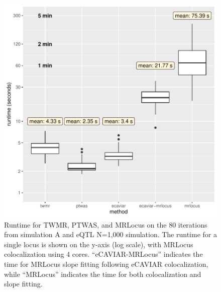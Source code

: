 \documentclass[11pt]{article}
\begin{document}
\begin{figure}[!ht]
  \centering
  \includegraphics[width=.7\textwidth]{figs/runtime}
  \caption{Runtime for TWMR, PTWAS, and MRLocus on the 80 iterations
    from simulation A and eQTL N=1,000 simulation.
    The runtime for a single locus is shown on the y-axis (log
    scale), with MRLocus colocalization using 4
    cores. ``eCAVIAR-MRLocus'' indicates the time for MRLocus slope
    fitting following eCAVIAR colocalization, while ``MRLocus''
    indicates the time for both colocalization and slope fitting.}
\end{figure}
\end{document}
